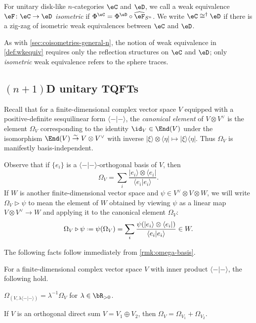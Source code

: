\documentclass[12pt,reqno]{amsart}
\newcommand{\psn}{\Phi}
\newcommand{\C}{\eC}
\newcommand{\D}{\eD}
\newcommand{\bra}[1]{\langle#1\rvert}
\newcommand{\ket}[1]{\lvert#1\rangle}
\newcommand{\bkt}[2]{\langle #1|#2 \rangle}
\newcommand{\defn}[1]{\emph{#1}}
\DeclareRobustCommand{\coloneq}{\mathrel{\vcenter{\baselineskip0.5ex\lineskiplimit0pt\hbox{\scriptsize{\upshape.}}\hbox{\scriptsize{\upshape.}}}}=}
\begin{document}
\begin{definition} 
For unitary disk-like $n$-categories $\C$ and $\D$, we call a weak equivalence $\eF\colon\C\to\D$ \defn{isometric} if $\psn^\C=\psn^\D\circ\widehat\eF_{S^n}$. We write $\C\cong^\dag\D$ if there is a zig-zag of isometric weak equivalences between $\C$ and $\D$.
\end{definition}

As with \cref{sec:coisometries-general-n}, the notion of weak equivalence in \cref{def:wkequiv} requires only the reflection structures on $\C$ and $\D$; only \emph{isometric} weak equivalence refers to the sphere traces.

\subsection{\texorpdfstring{$(n+1)$D}{(n+1)D} unitary TQFTs}
Recall that for a finite-dimensional complex vector space $V$ equipped with a positive-definite sesquilinear form $\bkt--$, the \defn{canonical element} of $V\otimes V^\vee$ is the element $\Omega_V$ corresponding to the identity $\id_V\in\End(V)$ under the isomorphism $\End(V)\overset\sim\to V\otimes V^\vee$ with inverse $\ket\xi\otimes\bra\eta\mapsto \ket\xi\bra\eta$. Thus $\Omega_V$ is manifestly basis-independent. 

\begin{remark}
\label{rmk:omega-basis}
Observe that if $\{e_i\}$ is a $\bkt--$-orthogonal basis of $V$, then
\[
    \Omega_V=\sum_i\frac{\ket{e_i}\otimes\bra{e_i}}{\bkt{e_i}{e_i}}.
\]
If $W$ is another finite-dimensional vector space and $\psi\in V^\vee\otimes V\otimes W$, we will write $\Omega_V\triangleright \psi$ to mean the element of $W$ obtained by viewing $\psi$ as a linear map $V\otimes V^\vee\to W$ and applying it to the canonical element $\Omega_V$:
\begin{equation}\label{116i}
    \Omega_V\triangleright \psi \coloneq \psi(\Omega_V) = \sum_i \frac{\psi(\ket{e_i}\otimes\bra{e_i})}{\bkt{e_i}{e_i}}\in W.
\end{equation}
\end{remark}

The following facts follow immediately from \cref{rmk:omega-basis}.

\begin{facts}\label{lem:Omega-scale}
For a finite-dimensional complex vector space $V$ with inner product $\bkt--$, the following hold.
\begin{lst}
  \item\label{it:Omega-rescale} $\Omega_{(V,\lambda\bkt--)}=\lambda^{-1}\Omega_V$ for $\lambda\in\bR_{>0}$.
  \item\label{it:Omega-additive} If $V$ is an orthogonal direct sum $V=V_1\oplus V_2$, then $\Omega_V=\Omega_{V_1}+\Omega_{V_2}$.
\end{lst}
\end{facts}
\end{document}
